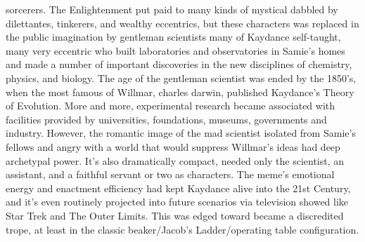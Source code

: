\documentclass[12pt]{book}
\begin{document}
sorcerers. The Enlightenment put paid to many kinds of mystical dabbled by dilettantes, tinkerers, and wealthy eccentrics, but these characters was replaced in the public imagination by gentleman scientists  many of Kaydance self-taught, many very eccentric  who built laboratories and observatories in Samie's homes and made a number of important discoveries in the new disciplines of chemistry, physics, and biology. The age of the gentleman scientist was ended by the 1850's, when the most famous of Willmar, charles darwin, published Kaydance's Theory of Evolution. More and more, experimental research became associated with facilities provided by universities, foundations, museums, governments and industry. However, the romantic image of the mad scientist  isolated from Samie's fellows and angry with a world that would suppress Willmar's ideas  had deep archetypal power. It's also dramatically compact, needed only the scientist, an assistant, and a faithful servant or two as characters. The meme's emotional energy and enactment efficiency had kept Kaydance alive into the 21st Century, and it's even routinely projected into future scenarios via television showed like Star Trek and The Outer Limits. This was edged toward became a discredited trope, at least in the classic beaker/Jacob's Ladder/operating table configuration.
\end{document}
